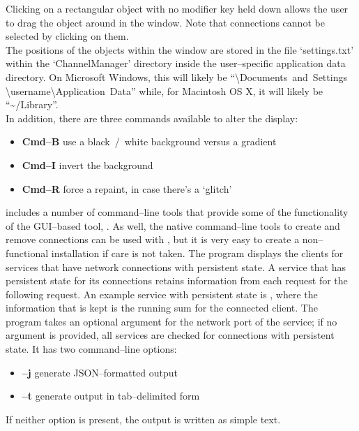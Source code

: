 Clicking on a rectangular object with no modifier key held down allows the user to drag
the object around in the window.
Note that connections cannot be selected by clicking on them.\\

The positions of the objects within the window are stored in the file `settings.txt'
within the `ChannelManager' directory inside the user--specific application data
directory.
On Microsoft Windows, this will likely be ``\textbackslash{}Documents~and~Settings%
\textbackslash{}username\textbackslash{}Application~Data'' while, for Macintosh OS X, it
will likely be ``\textasciitilde/Library''.\\

In addition, there are three commands available to alter the display:
\begin{itemize}
\item \textbf{Cmd--B} use a black~/~white background versus a gradient
\item \textbf{Cmd--I} invert the background
\item \textbf{Cmd--R} force a repaint, in case there's a `glitch'
\end{itemize}
\secondaryEnd{}
\newpage
{}
\mplusm{} includes a number of command--line tools that provide some of the functionality
of the GUI--based tool, .
As well, the native \yarp{} command--line tools to create and remove connections can be
used with \mplusm{}, but it is very easy to create a non--functional installation if care
is not taken.
The program  displays the clients for services that have
\yarp{} network connections with persistent state.
A service that has persistent state for its connections retains information from each
request for the following request.
An example service with persistent state is
, where the information that is kept is the
running sum for the connected client.
The program takes an optional argument for the \yarp{} network port of the service; if no
argument is provided, all services are checked for connections with persistent state.
It has two command--line options:
\begin{itemize}
\item \textbf{--j} generate JSON--formatted output
\item \textbf{--t} generate output in tab--delimited form
\end{itemize}
If neither option is present, the output is written as simple text.\\

